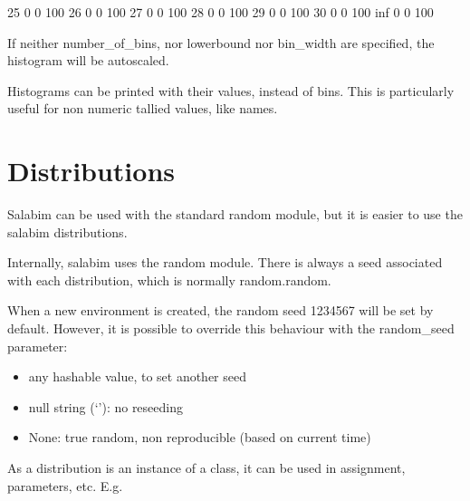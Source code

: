 \documentclass[letterpaper,10pt,english]{sphinxmanual}
\begin{document}
\begin{sphinxVerbatim}[commandchars=\\\{\}]
       25             0       0   100                                                                                   \textbar{}
       26             0       0   100                                                                                   \textbar{}
       27             0       0   100                                                                                   \textbar{}
       28             0       0   100                                                                                   \textbar{}
       29             0       0   100                                                                                   \textbar{}
       30             0       0   100                                                                                   \textbar{}
          inf         0       0   100
\end{sphinxVerbatim}

If neither number\_of\_bins, nor lowerbound nor bin\_width are specified, the histogram will be autoscaled.

Histograms can be printed with their values, instead of bins. This is particularly useful for non
numeric tallied values, like names.


\chapter{Distributions}
\label{\detokenize{Distributions:distributions}}\label{\detokenize{Distributions::doc}}
Salabim can be used with the standard random module, but it is easier to use the salabim distributions.

Internally, salabim uses the random module. There is always a seed associated with each distribution, which
is normally random.random.

When a new environment is created, the random seed 1234567 will be set by default. However, it is possible to
override this behaviour with the random\_seed parameter:
\begin{itemize}
\item {} 
any hashable value, to set another seed

\item {} 
null string (‘’): no reseeding

\item {} 
None: true random, non reproducible (based on current time)

\end{itemize}

As a distribution is an instance of a class, it can be used in assignment, parameters, etc. E.g.
\end{document}
